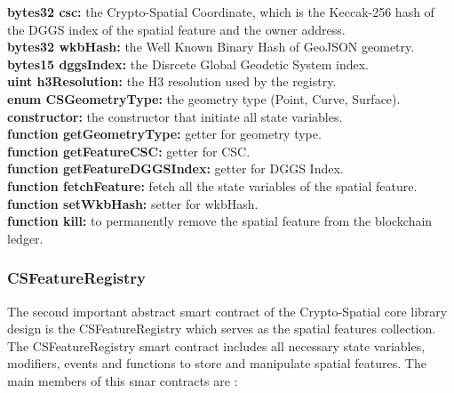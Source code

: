 \documentclass{isprs} %
\begin{document}
\textbf{bytes32 csc:} the Crypto-Spatial Coordinate, which is the Keccak-256 hash of the DGGS index of the spatial feature and the owner address. \\
\textbf{bytes32 wkbHash:} the Well Known Binary Hash of GeoJSON geometry. \\
\textbf{bytes15 dggsIndex:} the Disrcete Global Geodetic System index. \\
\textbf{uint h3Resolution:} the H3 resolution used by the registry.\\
\textbf{enum CSGeometryType:} the geometry type (Point, Curve, Surface). \\
\textbf{constructor:} the constructor that initiate all state variables. \\
\textbf{function getGeometryType:} getter for geometry type. \\
\textbf{function getFeatureCSC:} getter for CSC. \\
\textbf{function getFeatureDGGSIndex:} getter for DGGS Index. \\
\textbf{function fetchFeature:} fetch all the state variables of the spatial feature. \\
\textbf{function setWkbHash:} setter for wkbHash.\\
\textbf{function kill:} to permanently remove the spatial feature from the blockchain ledger.

\subsubsection{CSFeatureRegistry}\label{sec:CSFeatureRegistry}

The second important abstract smart contract of the Crypto-Spatial core library design is the CSFeatureRegistry which serves as the spatial features collection. 
The CSFeatureRegistry smart contract includes all necessary state variables, modifiers, events and functions to store and manipulate spatial features. The main members of this smar contracts are :
\end{document}
